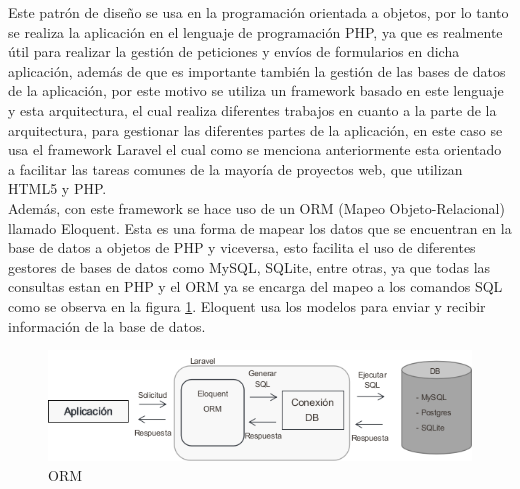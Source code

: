 Este patrón de diseño se usa en la programación orientada a objetos, por lo tanto se realiza la aplicación en el lenguaje de programación PHP, ya que es realmente útil para realizar la gestión de peticiones y envíos de formularios en dicha aplicación, además de que es importante también la gestión de las bases de datos de la aplicación, por este motivo se utiliza un framework basado en este lenguaje y esta arquitectura, el cual realiza diferentes trabajos en cuanto a la parte de la arquitectura, para gestionar las diferentes partes de la aplicación, en este caso se usa el framework Laravel el cual como se menciona anteriormente esta orientado a facilitar las tareas comunes de la mayoría de proyectos web, que utilizan HTML5 y PHP.\\

Además, con este framework se hace uso de un ORM (Mapeo Objeto-Relacional) llamado Eloquent. Esta es una forma de mapear los datos que se encuentran en la base de datos a objetos de PHP y viceversa, esto facilita el uso de diferentes gestores de bases de datos como MySQL, SQLite, entre otras, ya que todas las consultas estan en PHP y el ORM ya se encarga del mapeo a los comandos SQL como se observa en la figura \ref{fig:orm}. Eloquent usa los modelos para enviar y recibir información de la base de datos.

\begin{figure}[H]
	\centering
	\caption{ORM}
	\label{fig:orm}
	\includegraphics[width=0.7\linewidth]{Imagenes/ORM}
\end{figure}


